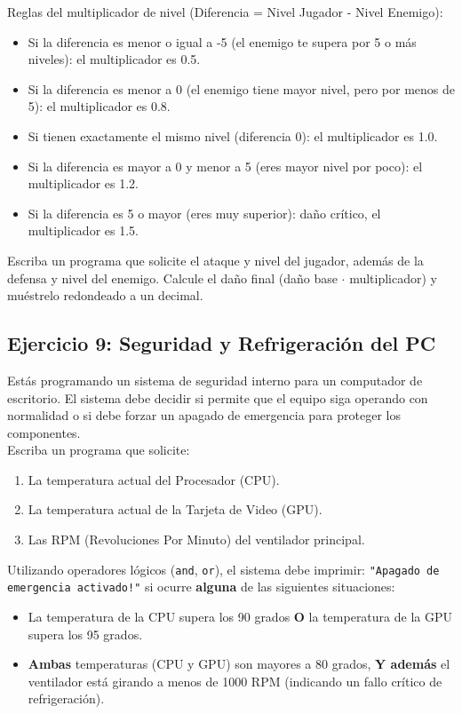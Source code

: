 \documentclass[11pt, a4paper]{article}
\begin{document}
	Reglas del multiplicador de nivel (Diferencia = Nivel Jugador - Nivel Enemigo):
	\begin{itemize}
		\item Si la diferencia es menor o igual a -5 (el enemigo te supera por 5 o más niveles): el multiplicador es 0.5.
		\item Si la diferencia es menor a 0 (el enemigo tiene mayor nivel, pero por menos de 5): el multiplicador es 0.8.
		\item Si tienen exactamente el mismo nivel (diferencia 0): el multiplicador es 1.0.
		\item Si la diferencia es mayor a 0 y menor a 5 (eres mayor nivel por poco): el multiplicador es 1.2.
		\item Si la diferencia es 5 o mayor (eres muy superior): daño crítico, el multiplicador es 1.5.
	\end{itemize}
	
	Escriba un programa que solicite el ataque y nivel del jugador, además de la defensa y nivel del enemigo. Calcule el daño final (daño base $\cdot$ multiplicador) y muéstrelo redondeado a un decimal.
	
	
	\subsection*{Ejercicio 9: Seguridad y Refrigeración del PC}
	
	Estás programando un sistema de seguridad interno para un computador de escritorio. El sistema debe decidir si permite que el equipo siga operando con normalidad o si debe forzar un apagado de emergencia para proteger los componentes. \\
	
	Escriba un programa que solicite:
	\begin{enumerate}
		\item La temperatura actual del Procesador (CPU).
		\item La temperatura actual de la Tarjeta de Video (GPU).
		\item Las RPM (Revoluciones Por Minuto) del ventilador principal.
	\end{enumerate}
	
	Utilizando operadores lógicos (\texttt{and}, \texttt{or}), el sistema debe imprimir:  \texttt{"{}Apagado de emergencia activado!"} si ocurre \textbf{alguna} de las siguientes situaciones:
	\begin{itemize}
		\item La temperatura de la CPU supera los 90 grados \textbf{O} la temperatura de la GPU supera los 95 grados.
		\item \textbf{Ambas} temperaturas (CPU y GPU) son mayores a 80 grados, \textbf{Y además} el ventilador está girando a menos de 1000 RPM (indicando un fallo crítico de refrigeración).
	\end{itemize}
	
\end{document}
